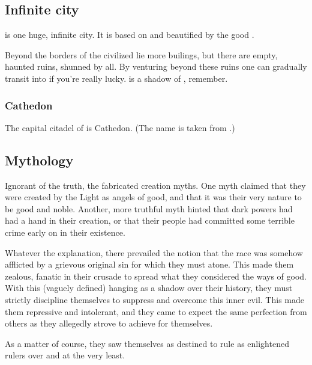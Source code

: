 \subsection{Infinite city}
\Merkyrah{} is one huge, infinite city. 
It is based on \Erebos{} and beautified by the good \resphain. 

Beyond the borders of the civilized \Merkyrah{} lie more builings, but there are empty, haunted ruins, shunned by all. 
By venturing beyond these ruins one can gradually transit into \Erebos\dash if you're really lucky. 
\Nyx{} is a shadow of \Erebos, remember. 





\subsubsection{Cathedon}
The capital citadel of \Merkyrah{} is Cathedon. 
(The name is taken from .) 









\subsection{Mythology}
Ignorant of the truth, the \Merkyrans{} fabricated creation myths. One myth claimed that they were created by the Light as angels of good, and that it was their very nature to be good and noble. Another, more truthful myth hinted that dark powers had had a hand in their creation, or that their people had committed some terrible crime early on in their existence. 

Whatever the explanation, there prevailed the notion that the \resphan{} race was somehow afflicted by a grievous original sin for which they must atone. This made them zealous, fanatic in their crusade to spread what they considered the ways of good. With this (vaguely defined)  hanging as a shadow over their history, they must strictly discipline themselves to suppress and overcome this inner evil. This made them repressive and intolerant, and they came to expect the same perfection from others as they allegedly strove to achieve for themselves. 

As a matter of course, they saw themselves as destined to rule as enlightened rulers over \humans{} and \nephilim{} at the very least. 

